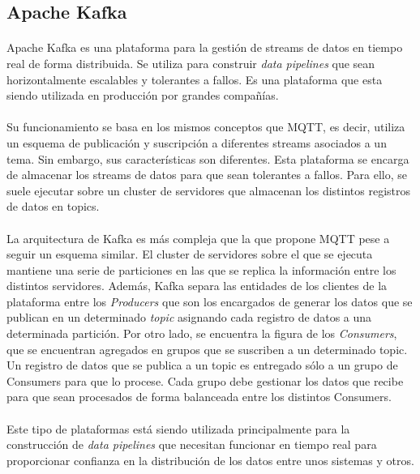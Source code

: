 \documentclass[12pt, a4paper]{article}
\begin{document}
        \subsection{Apache Kafka}
        
        \paragraph{}
        Apache Kafka es una plataforma para la gestión de streams de datos en tiempo real de forma distribuida. Se utiliza para construir \textit{data pipelines} que sean horizontalmente escalables y tolerantes a fallos. Es una plataforma que esta siendo utilizada en producción por grandes compañías.

        \paragraph{}
        Su funcionamiento se basa en los mismos conceptos que MQTT, es decir, utiliza un esquema de publicación y suscripción a diferentes streams asociados a un tema. Sin embargo, sus características son diferentes. Esta plataforma se encarga de almacenar los streams de datos para que sean tolerantes a fallos. Para ello, se suele ejecutar sobre un cluster de servidores que almacenan los distintos registros de datos en topics. 

        \paragraph{}
        La arquitectura de Kafka es más compleja que la que propone MQTT pese a seguir un esquema similar. El cluster de servidores sobre el que se ejecuta mantiene una serie de particiones en las que se replica la información entre los distintos servidores. Además, Kafka separa las entidades de los clientes de la plataforma entre los \textit{Producers} que son los encargados de generar los datos que se publican en un determinado \textit{topic} asignando cada registro de datos a una determinada partición. Por otro lado, se encuentra la figura de los \textit{Consumers}, que se encuentran agregados en grupos que se suscriben a un determinado topic. Un registro de datos que se publica a un topic es entregado sólo a un grupo de Consumers para que lo procese. Cada grupo debe gestionar los datos que recibe para que sean procesados de forma balanceada entre los distintos Consumers.

        \paragraph{}
        Este tipo de plataformas está siendo utilizada principalmente para la construcción de \textit{data pipelines} que necesitan funcionar en tiempo real para proporcionar confianza en la distribución de los datos entre unos sistemas y otros.
\end{document}
